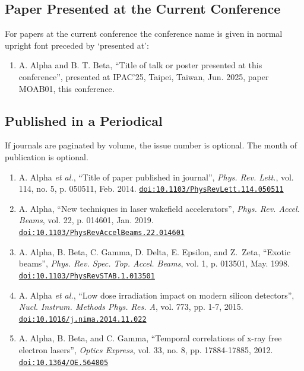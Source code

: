 \documentclass[%
               hyphens,       %
               ]{jacow}
\begin{document}
\subsection{Paper Presented at the Current Conference}

For papers at the current conference the conference name is given in normal upright font preceded by ‘presented at’:
\begin{enumerate}[resume*]\small
	\item  A. Alpha and B. T. Beta, “Title of talk or poster presented at this conference”, 
		presented at IPAC’25, Taipei, Taiwan, Jun. 2025, paper MOAB01, this conference.
\end{enumerate}

\subsection{Published in a Periodical}

If journals are paginated by volume, the issue number is optional. 
The month of publication is optional.

\begin{enumerate}[leftmargin=22pt, resume*]\small
	\item A. Alpha \textit{et al.}, “Title of paper published in journal”, 
		\textit{Phys. Rev. Lett.}, vol. 114, no. 5, p. 050511, Feb. 2014. 
		\href{https://doi.org/10.1103/PhysRevLett.114.050511}%
		     {\texttt{doi:10.1103/PhysRevLett.114.050511}}

	\item A. Alpha, “New techniques in laser wakefield accelerators”, 
		\textit{Phys. Rev. Accel. Beams}, vol. 22, p. 014601, Jan. 2019. \\ \href{https://doi.org/10.1103/PhysRevAccelBeams.22.014601}%
		     {\texttt{doi:10.1103/PhysRevAccelBeams.22.014601}}

	\item A. Alpha, B. Beta, C. Gamma, D. Delta, E. Epsilon, and Z.~Zeta, 
		“Exotic beams”, \textit{Phys. Rev. Spec. Top. Accel. Beams}, vol. 1, p. 013501, May. 1998.	\\ \href{https://doi.org/10.1103/PhysRevSTAB.1.013501}%
		     {\texttt{doi:10.1103/PhysRevSTAB.1.013501}}

	\item A. Alpha \textit{et al.}, 
		“Low dose irradiation impact on modern silicon detectors”, 
		\textit{Nucl. Instrum. Methods Phys. Res. A}, vol. 773, pp. 1-7, 2015. \\ \href{https://doi.org/10.1016/j.nima.2014.11.022}%
		     {\texttt{doi:10.1016/j.nima.2014.11.022}}

	\item A. Alpha, B. Beta, and C. Gamma, 
		“Temporal correlations of x-ray free electron lasers”, 
		\textit{Optics Express}, vol. 33, no. 8, pp. 17884-17885, 2012. \\
		\href{https://doi.org/10.1364/OE.564805}%
			 {\texttt{doi:10.1364/OE.564805}}
\end{enumerate}
\end{document}
